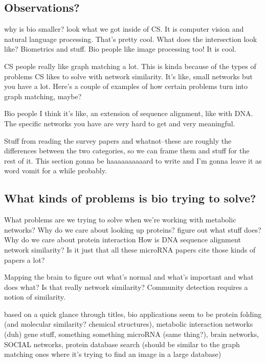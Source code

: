 \documentclass[12pt]{thesis}
\theoremstyle{plain}
\theoremstyle{definition}
\theoremstyle{remark}
\begin{document}
\subsection{Observations?}

why is bio smaller? look what we got inside of CS. It is computer vision and natural language processing. That's pretty cool. What does the intersection look like? Biometrics and stuff. Bio people like image processing too! It is cool.

CS people really like graph matching a lot. This is kinda because of the types of problems CS likes to solve with network similarity. It's like, small networks but you have a lot. Here's a couple of examples of how certain problems turn into graph matching, maybe?

Bio people I think it's like, an extension of sequence alignment, like with DNA. The specific networks you have are very hard to get and very meaningful.

Stuff from reading the survey papers and whatnot--these are roughly the differences between the two categories, so we can frame them and stuff for the rest of it. This section gonna be haaaaaaaaaard to write and I'm gonna leave it as word vomit for a while probably. 




\subsection{What kinds of problems is bio trying to solve?}

What problems are we trying to solve when we're working with metabolic networks? Why do we care about looking up proteins?  figure out what stuff does? Why do we care about protein interaction How is DNA sequence alignment network similarity? Is it just that all these microRNA papers cite those kinds of papers a lot? 

Mapping the brain to figure out what's normal and what's important and what does what? Is that really network similarity? Community detection requires a notion of similarity.

based on a quick glance through titles, bio applications seem to be protein folding (and molecular similarity? chemical structures), metabolic interaction networks (duh) gene stuff, something something microRNA (same thing?), brain networks, SOCIAL networks, protein database search (should be similar to the graph matching ones where it's trying to find an image in a large database)
\end{document}

